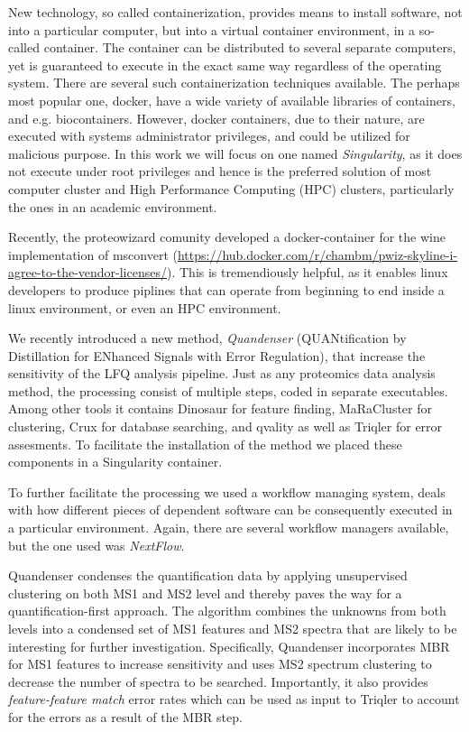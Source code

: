 \documentclass[11pt]{article}
\begin{document}
New technology, so called containerization, provides means to install software, not into a particular computer, but into a virtual container environment, in a so-called container. The container can be distributed to several separate computers, yet is guaranteed to execute in the exact same way regardless of the operating system. There are several such containerization techniques available. The perhaps most popular one, docker, have a wide variety of available libraries of containers, and e.g. biocontainers\cite{}. However, docker containers, due to their nature, are executed with systems administrator privileges, and could be utilized for malicious purpose.  In this work we will focus on one named \textit{Singularity}, as it does not execute under root privileges and hence is the preferred solution of most computer cluster and High Performance Computing (HPC) clusters, particularly the ones in an academic environment.

Recently, the proteowizard comunity developed a docker-container for the wine implementation of msconvert (\url{https://hub.docker.com/r/chambm/pwiz-skyline-i-agree-to-the-vendor-licenses/}). This is tremendiously helpful, as it enables linux developers to produce piplines that can operate from beginning to end inside a linux environment, or even an HPC environment.

We recently introduced a new method, {\em Quandenser} (QUANtification by
Distillation for ENhanced Signals with Error Regulation), that increase the sensitivity of the LFQ
analysis pipeline. Just as any proteomics data analysis method, the processing consist of multiple steps, coded in separate executables. Among other tools it contains Dinosaur\cite{teleman2016dinosaur} for feature finding, MaRaCluster\cite{the2016maracluster} for clustering, Crux\cite{mcilwain2014} for database searching, and qvality\cite{kall2008non} as well as Triqler\cite{the2018integrated} for error assesments. To facilitate the installation of the method we placed these components in a Singularity container.

To further facilitate the processing we used a workflow managing system, deals with how different pieces of dependent software can be consequently executed in a particular environment. Again, there are several workflow managers available, but the one used was \textit{NextFlow}\cite{di2017nextflow}.

Quandenser condenses the quantification data by applying
unsupervised clustering on both MS1 and MS2 level and thereby paves the way for
a quantification-first approach. The algorithm combines the unknowns from both
levels into a condensed set of MS1 features and MS2 spectra that are likely to
be interesting for further investigation. Specifically, Quandenser incorporates
MBR for MS1 features to increase sensitivity and uses MS2 spectrum clustering
to decrease the number of spectra to be searched. Importantly, it also provides
{\em feature-feature match} error rates which can be used as input to Triqler
to account for the errors as a result of the MBR step.
\end{document}
